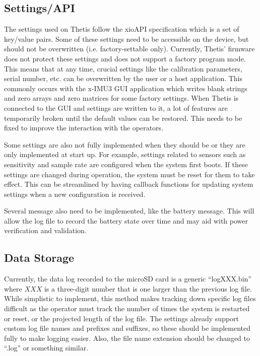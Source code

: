 \subsection{Settings/API} 
The settings used on Thetis follow the xioAPI specification which is a set of key/value pairs.
Some of these settings need to be accessible on the device, but should not be overwritten (i.e. factory-settable only).
Currently, Thetis' firmware does not protect these settings and does not support a factory program mode.
This means that at any time, crucial settings like the calibration parameters, serial number, etc. can be overwritten by the user or a host application.
This commonly occurs with the x-IMU3 GUI application which writes blank strings and zero arrays and zero matrices for some factory settings.
When Thetis is connected to the GUI and settings are written to it, a lot of features are temporarily broken until the default values can be restored.
This needs to be fixed to improve the interaction with the operators.

Some settings are also not fully implemented when they should be or they are only implemented at start up.
For example, settings related to sensors such as sensitivity and sample rate are configured when the system first boots.
If these settings are changed during operation, the system must be reset for them to take effect.
This can be streamlined by having callback functions for updating system settings when a new configuration is received.

Several message also need to be implemented, like the battery message.
This will allow the log file to record the battery state over time and may aid with power verification and validation.

\subsection{Data Storage} 
Currently, the data log recorded to the microSD card is a generic ``logXXX.bin'' where $XXX$ is a three-digit number that is one larger than the previous log file.
While simplistic to implement, this method makes tracking down specific log files difficult as the operator must track the number of times the system is restarted or reset, or the projected length of the log file.
The settings already support custom log file names and prefixes and suffixes, so these should be implemented fully to make logging easier.
Also, the file name extension should be changed to ``.log'' or something similar.

